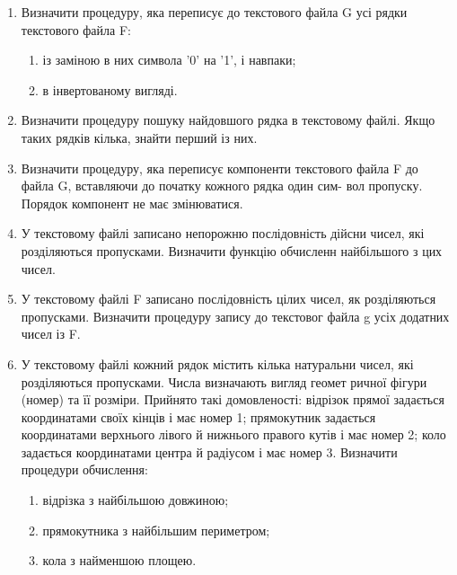 \documentclass[]{article}
\makeatletter
\newcommand{\xslalph}[1]{\expandafter\@xslalph\csname c@#1\endcsname}
\newcommand{\@xslalph}[1]{%
    \ifcase#1\or а\or б\or в\or г\or д\or e\or є\or ж\or з\or i%
    \or й\or к\or л\or м\or н\or о\or п\or р\or с\or т%
    \or у\or ф\or х\or ц\or ч\or ш\or ю\or я\or аа\or бб\or вв %
    \else\@ctrerr\fi%
}
\makeatother
\begin{document}
\begin{enumerate}
\item  Визначити процедуру, яка переписує до текстового файла G усі 
рядки текстового файла F: 
\begin{enumerate}[label=\xslalph*)]
\item із заміною в них символа '0' на '1', і навпаки; 
\item в інвертованому вигляді. 
\end{enumerate}

\item  Визначити  процедуру  пошуку  найдовшого  рядка  в  текстовому 
файлі. Якщо таких рядків кілька, знайти перший із них. 


\item  Визначити  процедуру,  яка  переписує  компоненти  текстового 
файла F до файла G, вставляючи до початку кожного рядка один сим-
вол пропуску. Порядок компонент не має змінюватися.

\item  У текстовому файлі записано непорожню послідовність дійсни
чисел,  які  розділяються  пропусками.  Визначити  функцію  обчисленн
найбільшого з цих чисел. 

\item  У  текстовому файлі F  записано  послідовність  цілих  чисел,  як
розділяються  пропусками.  Визначити  процедуру  запису  до  текстовог
файла g усіх додатних чисел із F. 

\item  У  текстовому файлі  кожний  рядок  містить  кілька  натуральни
чисел, які розділяються пропусками. Числа визначають вигляд  геомет
ричної фігури (номер) та її розміри. Прийнято такі домовленості: 
 відрізок прямої задається координатами своїх кінців і має номер 1;
 прямокутник задається координатами верхнього лівого й нижнього
правого кутів і має номер 2; 
 коло задається координатами центра й радіусом і має номер 3. 
Визначити процедури обчислення: 
\begin{enumerate}[label=\xslalph*)]
\item відрізка з найбільшою довжиною; 
\item прямокутника з найбільшим периметром; 
\item кола з найменшою площею.
\end{enumerate}


\end{enumerate}
\end{document}

